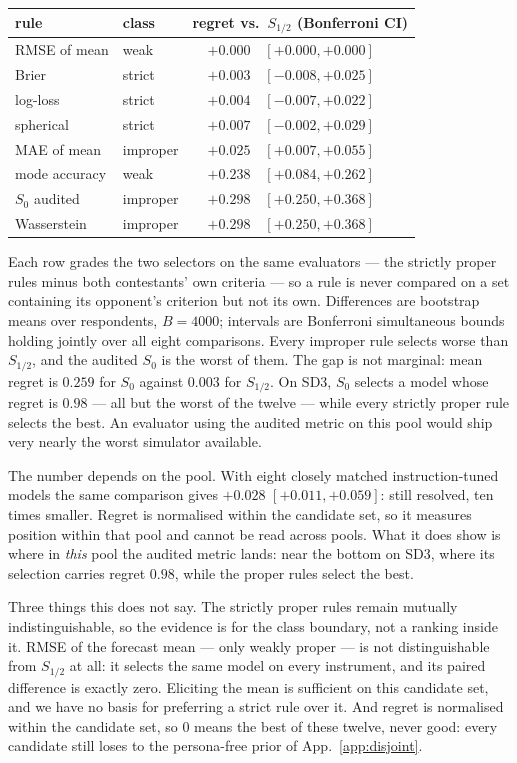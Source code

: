 \documentclass[11pt]{article}
\begin{document}
\begin{center}\small
\setlength{\tabcolsep}{3.5pt}
\begin{tabular}{@{}llr@{\,}l@{}}
\toprule
rule & class & \multicolumn{2}{c}{regret vs.\ $S_{1/2}$ (Bonferroni CI)}\\
\midrule
RMSE of mean & weak & $+0.000$ & $[+0.000,+0.000]$\\
Brier & strict & $+0.003$ & $[-0.008,+0.025]$\\
log-loss & strict & $+0.004$ & $[-0.007,+0.022]$\\
spherical & strict & $+0.007$ & $[-0.002,+0.029]$\\
MAE of mean & improper & $+0.025$ & $[+0.007,+0.055]$\\
mode accuracy & weak & $+0.238$ & $[+0.084,+0.262]$\\
$S_0$ audited & improper & $+0.298$ & $[+0.250,+0.368]$\\
Wasserstein & improper & $+0.298$ & $[+0.250,+0.368]$\\
\bottomrule
\end{tabular}
\end{center}

Each row grades the two selectors on the same evaluators --- the strictly
proper rules minus both contestants' own criteria --- so a rule is never
compared on a set containing its opponent's criterion but not its own.
Differences are bootstrap means over respondents, $B{=}4000$; intervals are
Bonferroni simultaneous bounds holding jointly over all eight comparisons. Every improper rule selects worse than
$S_{1/2}$, and the audited $S_0$ is the worst of them. The gap is not marginal:
mean regret is $0.259$ for $S_0$ against $0.003$ for $S_{1/2}$. On SD3, $S_0$
selects a model whose regret is $0.98$ --- all but the worst of the twelve ---
while every strictly proper rule selects the best. An evaluator using the
audited metric on this pool would ship very nearly the worst simulator
available.

The number depends on the pool. With eight closely matched instruction-tuned models the same comparison
gives $+0.028$ $[+0.011,+0.059]$: still resolved, ten times smaller. Regret is
normalised within the candidate set, so it measures position within that pool
and cannot be read across pools. What it does show is where in \emph{this}
pool the audited metric lands: near the bottom on SD3, where its selection
carries regret $0.98$, while the proper rules select the best.

Three things this does not say. The strictly proper rules remain mutually
indistinguishable, so the evidence is for the class boundary, not a ranking
inside it. RMSE of the forecast mean --- only weakly proper --- is not
distinguishable from $S_{1/2}$ at all: it selects the same model on every
instrument, and its paired difference is exactly zero. Eliciting the mean is
sufficient on this candidate set, and we have no basis for preferring a strict
rule over it. And regret is normalised within the candidate set, so $0$ means
the best of these twelve, never good: every candidate still loses to the
persona-free prior of App.~\ref{app:disjoint}.
\end{document}
